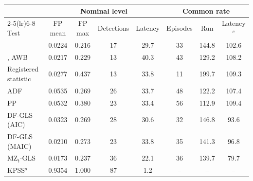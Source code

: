 \begin{tabular}{lccccccc}
\toprule
& \multicolumn{4}{c}{Nominal level} & \multicolumn{3}{c}{Common rate}\\
\cmidrule(lr){2-5}\cmidrule(lr){6-8}
Test & FP mean & FP max & Detections & Latency & Episodes & Run & Latency$^c$\\
\midrule
\RMGLS{} & 0.0224 & 0.216 & 17 & 29.7 & 33 & 144.8 & 102.6 \\
\RMGLS{}, AWB & 0.0217 & 0.229 & 13 & 40.3 & 43 & 129.2 & 108.2 \\
Registered statistic & 0.0277 & 0.437 & 13 & 33.8 & 11 & 199.7 & 109.3 \\
ADF & 0.0535 & 0.269 & 26 & 33.7 & 48 & 122.2 & 107.4 \\
PP & 0.0532 & 0.380 & 23 & 33.4 & 56 & 112.9 & 109.4 \\
DF-GLS (AIC) & 0.0323 & 0.269 & 28 & 30.6 & 32 & 146.8 & 93.6 \\
DF-GLS (MAIC) & 0.0210 & 0.273 & 23 & 33.8 & 35 & 141.3 & 96.8 \\
MZ$_t$-GLS & 0.0173 & 0.237 & 36 & 22.1 & 36 & 139.7 & 79.7 \\
KPSS$^a$ & 0.9354 & 1.000 & 87 & 1.2 & -- & -- & -- \\
\bottomrule
\end{tabular}
